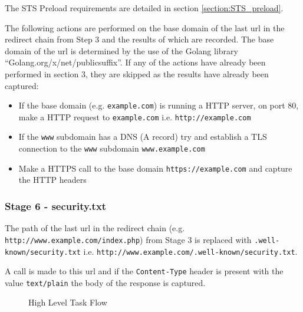 \documentclass{mscreport}
\begin{document}
\vspace{0.3cm} \noindent
The STS Preload requirements are detailed in section \ref{section:STS_preload}.

\vspace{0.3cm} \noindent
The following actions are performed on the base domain of the last url in the redirect chain from Step 3 and the results of which are recorded. The base domain of the url is determined by the use of the Golang library ``Golang.org/x/net/publicsuffix''. If any of the actions have already been performed in section 3, they are skipped as the results have already been captured:

\begin{itemize}
	\setlength\itemsep{0.1em}
    \item If the base domain (e.g. \texttt{example.com}) is running a HTTP server, on port 80, make a HTTP request to \texttt{example.com} i.e. \texttt{http://example.com}
    \item If the \texttt{www} subdomain has a DNS (A record) try and establish a TLS connection to the \texttt{www} subdomain \texttt{www.example.com}
    \item Make a HTTPS call to the base domain \texttt{https://example.com} and capture the HTTP headers
\end{itemize}


\subsubsection{Stage 6 - security.txt}

The path of the last url in the redirect chain (e.g. \texttt{http://www.example.com/index.php}) from Stage 3 is replaced with \texttt{.well-known/security.txt} i.e. \newline \texttt{http://www.example.com/.well-known/security.txt}.

\vspace{0.3cm} \noindent
A call is made to this url and if the \texttt{Content-Type} header is present with the value \texttt{text/plain} the body of the response is captured.


\begin{figure}[p]
	\begin{center}
		\caption{High Level Task Flow}
		\label{fig:task_flow}
	\end{center}
\end{figure}
\end{document}
